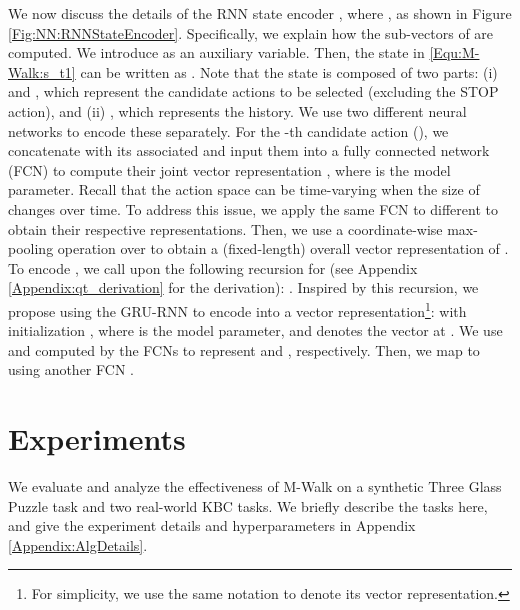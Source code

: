 \documentclass{article}
\newcommand{\modelname}{M-Walk}
\begin{document}
	We now discuss the details of the RNN state encoder , where , as shown in Figure \ref{Fig:NN:RNNStateEncoder}. Specifically, we explain how the sub-vectors of  are computed. We introduce  as an auxiliary variable. Then, the state  in \eqref{Equ:\modelname:s_t1} can be written as . Note that the state  is composed of two parts: (i)  and , which represent the candidate actions to be selected (excluding the STOP action), and (ii) , which represents the history. We use two different neural networks to encode these separately. For the -th candidate action (), we concatenate  with its associated  and input them into a fully connected network (FCN)  to compute their joint vector representation , where  is the model parameter. Recall that the action space  can be time-varying when the size of  changes over time. To address this issue, we apply the same FCN  to different  to obtain their respective representations. Then, we use a coordinate-wise max-pooling operation over  to obtain a (fixed-length) overall vector representation of . To encode , we call upon the following recursion for  (see Appendix \ref{Appendix:qt_derivation} for the derivation): . Inspired by this recursion, we propose using the GRU-RNN \cite{cho2014learning} to encode  into a vector representation\footnote{For simplicity, we use the same notation  to denote its vector representation.}:  with initialization , where  is the model parameter, and  denotes the vector  at . We use  and  computed by the FCNs to represent  and , respectively. Then, we map  to  using another FCN . 


	
	
	
	
	
\section{Experiments}
\label{Sec:Experiments}


	We evaluate and analyze the effectiveness of M-Walk on a synthetic Three Glass Puzzle task and two real-world KBC tasks. We briefly describe the tasks here, and give the experiment details and hyperparameters in Appendix \ref{Appendix:AlgDetails}. 
	
\end{document}
